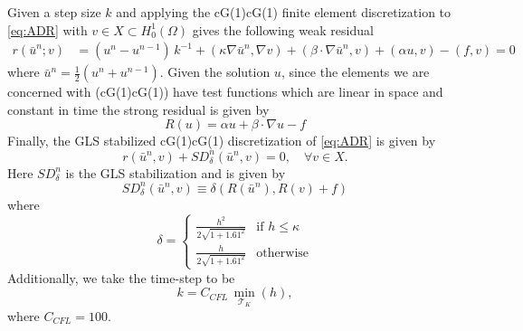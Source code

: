     Given a step size $k$ and applying the cG(1)cG(1) finite element
    discretization to \eqref{eq:ADR} with $v \in X \subset H^1_0(\Omega)$ gives
    the following weak residual
    \begin{equation}
    \begin{split}
        r(\bar{u}^n; v) &= \left(u^n - u^{n-1}\right)\,k^{-1}
            + (\kappa \nabla \bar{u}^n, \nabla v)
            + (\beta \cdot \nabla \bar{u}^n, v) + (\alpha u, v) - (f, v) = 0
    \end{split}
    \label{eqn:WeakADR}
    \end{equation}
    where $\bar{u}^n = \frac{1}{2}\left(u^n + u^{n-1}\right)$. Given the
    solution $u$, since the elements we are concerned with (cG(1)cG(1)) have
    test functions which are linear in space and constant in time the strong
    residual is given by
    \begin{equation}
        R(u) = \alpha u + \beta \cdot \nabla u - f
    \label{eqn:StrongADR}
    \end{equation}
    Finally, the GLS stabilized cG(1)cG(1) discretization of \eqref{eq:ADR} is
    given by
    \begin{equation}
        r(\bar{u}^n,v) + SD_{\delta}^n(\bar{u}^n,v) = 0,
            \quad \forall v \in X.
        \label{eqn:G2ADR}
    \end{equation}
    Here $SD_{\delta}^n$ is the GLS stabilization and is given by
    \begin{equation}
        SD_{\delta}^n(\bar{u}^n, v) \equiv \delta \left(R(\bar{u}^n), R(v)
            + f\right)
    \label{eq:ADRStabilization}
    \end{equation}
    where
    \begin{equation}
        \delta = \begin{cases}
            \frac{h^2}{2 \sqrt{1 + 1.61^2}} & \text{if } h \le \kappa \\
            \frac{h}{2 \sqrt{1 + 1.61^2}} & \text{otherwise}
        \end{cases}
        \label{eq:ADRdelta}
    \end{equation}
    Additionally, we take the time-step to be
    \begin{equation*}
    k = C_{CFL}\, \min_{\mathcal{T}_K}(h),
    \end{equation*}
    where $C_{CFL}=100$.

